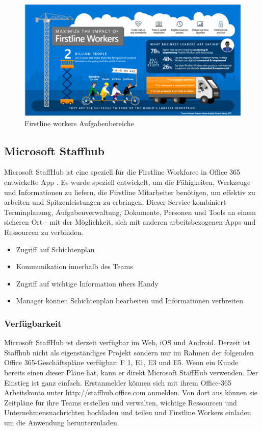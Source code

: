 \begin{figure}[H] 
\centering 
\includegraphics[scale=0.48]{images/frontlineworkers} 
\caption[Frontline Workers]{Firstline workers Aufgabenbereiche\protect} 
\label{dem} 
\end{figure}


\subsection{Microsoft Staffhub}

Microsoft StaffHub ist eine speziell für die Firstline Workforce in Office 365 entwickelte App . Es wurde speziell entwickelt, um die Fähigkeiten, Werkzeuge und Informationen zu liefern, die Firstline Mitarbeiter benötigen, um effektiv zu arbeiten und Spitzenleistungen zu erbringen. Dieser Service kombiniert Terminplanung, Aufgabenverwaltung, Dokumente, Personen und Tools an einem sicheren Ort - mit der Möglichkeit, sich mit anderen arbeitsbezogenen Apps und Ressourcen zu verbinden.
\begin{itemize}
\item Zugriff auf Schichtenplan
\item Kommunikation innerhalb des Teams
\item Zugriff auf wichtige Information übers Handy
\item Manager können Schichtenplan bearbeiten und Informationen verbreiten
\end{itemize}

\subsubsection{Verfügbarkeit}
Microsoft StaffHub ist derzeit verfügbar im Web, iOS und Android. Derzeit ist Staffhub nicht als eigenständiges Projekt sondern nur im Rahmen der folgenden Office 365-Geschäftspläne verfügbar: F 1, E1, E3 und E5. Wenn ein Kunde bereits einen dieser Pläne hat, kann er direkt Microsoft StaffHub verwenden. Der Einstieg ist ganz einfach. Erstanmelder können sich mit ihrem Office-365 Arbeitskonto unter http://staffhub.office.com anmelden. Von dort aus können sie Zeitpläne für ihre Teams erstellen und verwalten, wichtige Ressourcen und Unternehmensnachrichten hochladen und teilen und Firstline Workers einladen um die Anwendung herunterzuladen.

